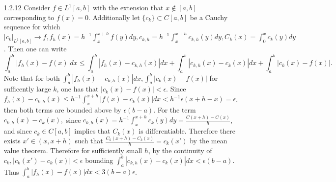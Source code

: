 \documentclass[12pt, letterpaper]{article}
\begin{document}
\begin{enumerate}
	\item[1.2.12] Consider $f \in L^1[a,b]$ with the extension that 
	$x \not \in [a,b]$ corresponding to $f(x) = 0$.  Additionally let 
	$\{c_k\} \subset C[a,b]$ be a Cauchy sequence for which 
	$|c_k|_{L^1[a,b]} \to f, f_h(x) = h^{-1}\int_x^{x+h} f(y)dy, 
	c_{k,h} = h^{-1}\int_x^{x+h} c_{k,h}(y)dy, 
	C_k(x) = \int_0^x c_k(y)dy$.  Then one can write
	$$\int_a^b |f_h(x) - f(x)|dx \leq 
	\int_a^b |f_h(x) - c_{k,h}(x)|dx + \int_a^b |c_{k,h}(x) - c_k(x)|dx
	+ \int_a^b |c_k(x) - f(x)|.$$
	Note that for both $\int_a^b |f_h(x) - c_{k,h}(x)|dx,\int_a^b |c_k(x) - f(x)|$ for 
	sufficently large $k$, one has that $|c_k(x) - f(x)| < \epsilon$.  Since 
	$f_h(x) - c_{k,h}(x) \leq h^{-1}\int_x^{x+h} |f(x) - c_k(x)|dx < h^{-1} \epsilon(x+h-x) = 
	\epsilon$, then both terms are bounded above by $\epsilon(b-a)$.  For the term 
	$c_{k,h}(x) - c_k(x),$ since $c_{k,h}(x) = h^{-1}\int_x^{x+h} c_k(y)dy = 
	\frac{C(x+h)-C(x)}{h}$, and since $c_k \in C[a,b]$ implies that $C_k(x)$ is 
	differentiable.  Therefore there exists $x' \in (x,x+h)$ such that $\frac{C_k(x+h)-C_k(x)}{h} = c_k(x')$ by the mean value theorem.  Therefore for sufficiently small $h$, by the 
	continuity of $c_k, |c_k(x')-c_k(x)| <\epsilon $ bounding $\int_a^b |c_{k,h}(x) - c_k(x)|dx < \epsilon(b-a)$.  Thus 
	$\int_a^b |f_h(x) - f(x)|dx < 3(b-a)\epsilon$.  
\end{enumerate}
\end{document}
